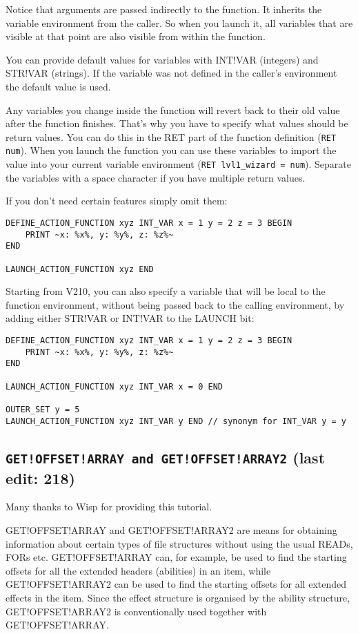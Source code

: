 \documentclass{article}
\def\DEFINE#1{{\tt \bf #1}\label{#1}\index{#1}}
\begin{document}
Notice that arguments are passed indirectly to the function.
It inherits the variable environment from the caller. So when you launch it,
all variables that are visible at that point are also visible from within the function.

You can provide default values for variables with INT!VAR (integers) and STR!VAR (strings).
If the variable was not defined in the caller's environment the default value is used.

Any variables you change inside the function will revert back to their old value
after the function finishes.
That's why you have to specify what values should be return values.
You can do this in the RET part of the function definition (\verb+RET num+).
When you launch the function you can use these variables to import the value
into your current variable environment (\verb+RET lvl1_wizard = num+).
Separate the variables with a space character if you have multiple return values.

If you don't need certain features simply omit them:
\begin{verbatim}
DEFINE_ACTION_FUNCTION xyz INT_VAR x = 1 y = 2 z = 3 BEGIN
    PRINT ~x: %x%, y: %y%, z: %z%~
END

LAUNCH_ACTION_FUNCTION xyz END
\end{verbatim}

Starting from V210, you can also specify a variable that will be local to the
function environment, without being passed back to the calling environment,
by adding either STR!VAR or INT!VAR to the LAUNCH bit:
\begin{verbatim}
DEFINE_ACTION_FUNCTION xyz INT_VAR x = 1 y = 2 z = 3 BEGIN
    PRINT ~x: %x%, y: %y%, z: %z%~
END

LAUNCH_ACTION_FUNCTION xyz INT_VAR x = 0 END

OUTER_SET y = 5
LAUNCH_ACTION_FUNCTION xyz INT_VAR y END // synonym for INT_VAR y = y
\end{verbatim}

\subsection{\DEFINE{GET!OFFSET!ARRAY and GET!OFFSET!ARRAY2} (last edit: 218)}

Many thanks to Wisp for providing this tutorial.

GET!OFFSET!ARRAY and GET!OFFSET!ARRAY2 are means for obtaining information about certain types of file structures without using the usual READs, FORs etc. GET!OFFSET!ARRAY can, for example, be used to find the starting offsets for all the extended headers (abilities) in an item, while GET!OFFSET!ARRAY2 can be used to find the starting offsets for all extended effects in the item. Since the effect structure is organised by the ability structure, GET!OFFSET!ARRAY2 is conventionally used together with GET!OFFSET!ARRAY.
\end{document}

